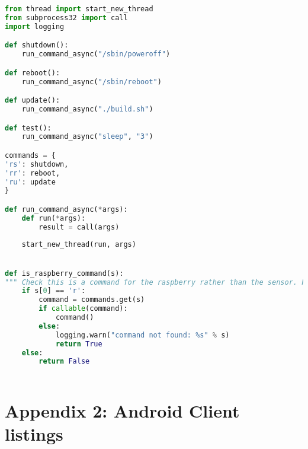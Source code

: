 \documentclass[hidelinks,11pt,a4paper,oneside,article]{memoir}
\begin{document}
\begin{lstlisting}[label={listing:rpi-subprocess},caption={Subprocess example},language=Python, style=styleprogrammingappendix]
from thread import start_new_thread
from subprocess32 import call
import logging

def shutdown():
    run_command_async("/sbin/poweroff")

def reboot():
    run_command_async("/sbin/reboot")

def update():
    run_command_async("./build.sh")

def test():
    run_command_async("sleep", "3")

commands = {
'rs': shutdown,
'rr': reboot,
'ru': update
}

def run_command_async(*args):
    def run(*args):
        result = call(args)
    
    start_new_thread(run, args)


def is_raspberry_command(s):
""" Check this is a command for the raspberry rather than the sensor. First letter must be an 'r'"""
    if s[0] == 'r':
        command = commands.get(s)
        if callable(command):
            command()
        else:
            logging.warn("command not found: %s" % s)
            return True
    else:
        return False



\end{lstlisting}\vspace{14pt}

%



\clearpage
{}

\chapter{Appendix 2: Android Client listings}\label{appx:androidclient}
\end{document}
